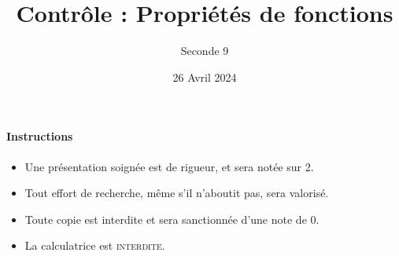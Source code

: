 \documentclass{exam}
\title{Contrôle : Propriétés de fonctions}
\date{26 Avril 2024}
\author{Seconde 9}
\begin{document}
\maketitle
\thispagestyle{head}

\paragraph*{Instructions}
\begin{itemize}
\item Une présentation soignée est de rigueur, et sera notée sur 2.
\item Tout effort de recherche, même s'il n'aboutit pas, sera valorisé.
\item Toute copie est interdite et sera sanctionnée d'une note de 0.
\item La calculatrice est \textsc{interdite}.
\end{itemize}
\vspace*{1cm}
\end{document}
